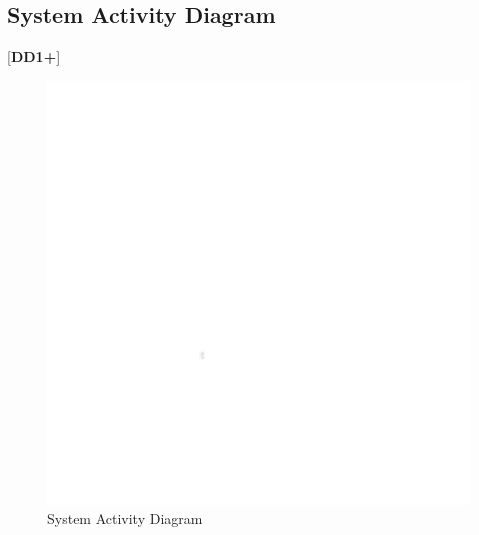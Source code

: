 \documentclass[letterpaper, 11pt]{article}
\begin{document}
\subsection{System Activity Diagram}
[\textbf{DD1+}]
\begin{figure}[h]
    \centering
    \includegraphics[width=16cm]{white.png} %
    \caption{System Activity Diagram}
\end{figure}

\clearpage
\end{document}
